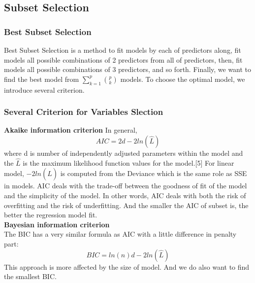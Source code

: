 \documentclass[a4paper]{article}
\begin{document}
\subsection{Subset Selection}
\subsubsection{Best Subset Selection}
Best Subset Selection is a method to fit models by each of predictors along, fit models all possible combinations of 2 predictors from all of predictors, then, fit models all possible combinations of 3 predictors, and so forth. Finally, we want to find the best model from $\sum_{k=1}^{p}\binom{p}{k}$ models. To choose the optimal model, we introduce several criterion.\\

\subsubsection{Several Criterion for Variables Slection}


\noindent
\textbf{Akaike information criterion}
In general, \[AIC = 2d - 2ln(\hat{L})\] where d is number of independently adjusted parameters within the model and the $\hat{L}$ is the maximum likelihood function values for the model.[5] For linear model, $- 2ln(\hat{L})$ is computed from the Deviance which is the same role as SSE in models. AIC deals with the trade-off between the goodness of fit of the model and the simplicity of the model. In other words, AIC deals with both the risk of overfitting and the risk of underfitting. And the smaller the AIC of subset is, the better the regression model fit.\\ 


\noindent
\textbf{Bayesian information criterion}\\
The BIC has a very similar formula as AIC with a little difference in penalty part:
\[BIC = ln(n)d - 2ln(\hat{L})\]
This approach is more affected by the size of model. And we do also want to find the smallest BIC.\\
\end{document}

